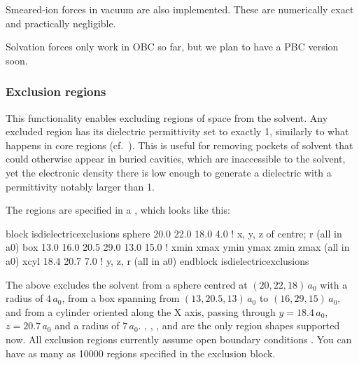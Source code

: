 \documentclass[letterpaper,10pt,english]{sphinxmanual}
\begin{document}
Smeared-ion forces in vacuum are also implemented. These are numerically
exact and practically negligible.

Solvation forces only work in OBC so far, but we plan to have a PBC
version soon.


\subsubsection{Exclusion regions}
\label{\detokenize{implicit_solvation_v3:exclusion-regions}}
This functionality enables excluding regions of space from the solvent.
Any excluded region has its dielectric permittivity set to exactly 1,
similarly to what happens in core regions (cf. ). This
is useful for removing pockets of solvent that could otherwise appear in
buried cavities, which are inaccessible to the solvent, yet the
electronic density there is low enough to generate a dielectric with a
permittivity notably larger than 1.

The regions are specified in a ,
which looks like this:

%
\begin{sphinxVerbatim}[commandchars=\\\{\}]
\PYGZpc{}block is\PYGZus{}dielectric\PYGZus{}exclusions
sphere 20.0 22.0 18.0 4.0             ! x, y, z of centre; r (all in a0)
box 13.0 16.0  20.5 29.0  13.0 15.0   ! xmin xmax  ymin ymax  zmin zmax (all in a0)
xcyl 18.4 20.7 7.0                    ! y, z, r (all in a0)
\PYGZpc{}endblock is\PYGZus{}dielectric\PYGZus{}exclusions
\end{sphinxVerbatim}

The above excludes the solvent from a sphere centred at
\((20,22,18)\,{a_0}{}\) with a radius of \(4\,{a_0}{}\), from a
box spanning from \((13,20.5,13)\,{a_0}{}\) to
\((16,29,15)\,{a_0}{}\), and from a cylinder oriented along the X
axis, passing through \(y=18.4\,{a_0}{}\), \(z=20.7\,{a_0}{}\)
and a radius of \(7\,{a_0}{}\). , , ,
 and  are the only region shapes supported now. All
exclusion regions currently assume open boundary conditions . You can have as many as 10000 regions specified in the
exclusion block.
\end{document}
